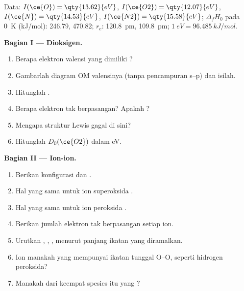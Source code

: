 \begin{problem}
\label{pb:b2:diatomic-mos:1}
Data: $I(\ce{O}) = \qty{13.62}{eV}$, $I(\ce{O2}) = \qty{12.07}{eV}$,
$I(\ce{N}) =
\qty{14.53}{eV}$, $I(\ce{N2}) = \qty{15.58}{eV}$;
$\Delta_f H_0$ pada \qty{0}{K} (\unit{kJ/mol}):  246.79, 
470.82; $r_e$:  \qty{120.8}{pm},  \qty{109.8}{pm};
$1\ \unit{eV} = \qty{96.485}{kJ/mol}$.

\medskip
\noindent\textbf{Bagian I --- Dioksigen.}
\begin{enumerate}
  \item Berapa elektron valensi yang dimiliki ?
  \item Gambarlah diagram OM valensinya (tanpa pencampuran s--p) dan
        isilah.
  \item Hitunglah .
  \item Berapa elektron tak berpasangan? Apakah  ?
  \item Mengapa struktur Lewis gagal di sini?
  \item Hitunglah $D_0(\ce{O2})$ dalam \unit{eV}.
\end{enumerate}

\medskip
\noindent\textbf{Bagian II --- Ion-ion.}
\begin{enumerate}[resume]
  \item Berikan konfigurasi dan  .
  \item Hal yang sama untuk ion superoksida .
  \item Hal yang sama untuk ion peroksida .
  \item Berikan jumlah elektron tak berpasangan setiap ion.
  \item Urutkan , , ,  menurut panjang
        ikatan yang diramalkan.
  \item Ion manakah yang mempunyai ikatan tunggal O--O, seperti hidrogen
        peroksida?
  \item Manakah dari keempat spesies itu yang ?
\end{enumerate}


\end{problem}
